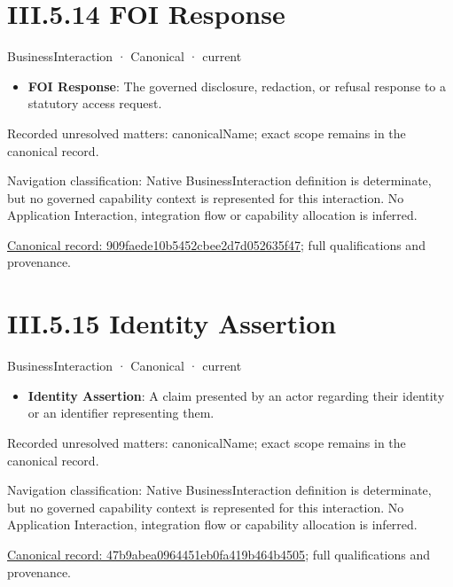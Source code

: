 \section*{III.5.14 FOI Response}
\label{navigation:III.5.14}

\label{element:909faede10b5452cbee2d7d052635f47}
{\small BusinessInteraction · Canonical · current}\par

\begin{itemize}


\item \textbf{FOI Response}: The governed disclosure, redaction, or refusal response to a statutory access request.

\end{itemize}

{\small Recorded unresolved matters: canonicalName; exact scope remains in the canonical record.}\par
{\small Navigation classification: Native BusinessInteraction definition is determinate, but no governed capability context is represented for this interaction. No Application Interaction, integration flow or capability allocation is inferred.}\par
{\footnotesize \href{../../../../../../../continuum/business/business-interaction/909faede10b5452cbee2d7d052635f47.md}{Canonical record: 909faede10b5452cbee2d7d052635f47}; full qualifications and provenance.}\par
\section*{III.5.15 Identity Assertion}
\label{navigation:III.5.15}

\label{element:47b9abea0964451eb0fa419b464b4505}
{\small BusinessInteraction · Canonical · current}\par

\begin{itemize}


\item \textbf{Identity Assertion}: A claim presented by an actor regarding their identity or an identifier representing them.

\end{itemize}

{\small Recorded unresolved matters: canonicalName; exact scope remains in the canonical record.}\par
{\small Navigation classification: Native BusinessInteraction definition is determinate, but no governed capability context is represented for this interaction. No Application Interaction, integration flow or capability allocation is inferred.}\par
{\footnotesize \href{../../../../../../../continuum/business/business-interaction/47b9abea0964451eb0fa419b464b4505.md}{Canonical record: 47b9abea0964451eb0fa419b464b4505}; full qualifications and provenance.}\par
